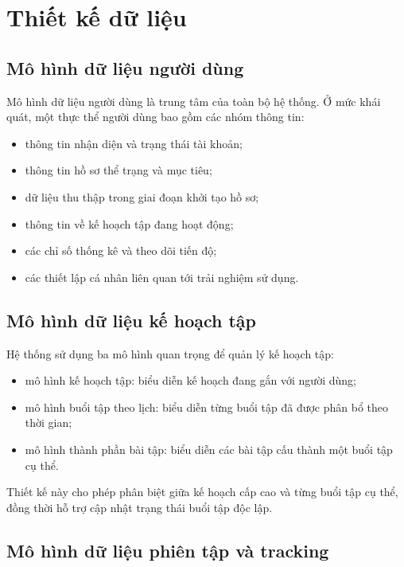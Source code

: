\section{Thiết kế dữ liệu}

\subsection{Mô hình dữ liệu người dùng}

Mô hình dữ liệu người dùng là trung tâm của toàn bộ hệ thống. Ở mức khái quát, một thực thể người dùng bao gồm các nhóm thông tin:

\begin{itemize}
    \item thông tin nhận diện và trạng thái tài khoản;
    \item thông tin hồ sơ thể trạng và mục tiêu;
    \item dữ liệu thu thập trong giai đoạn khởi tạo hồ sơ;
    \item thông tin về kế hoạch tập đang hoạt động;
    \item các chỉ số thống kê và theo dõi tiến độ;
    \item các thiết lập cá nhân liên quan tới trải nghiệm sử dụng.
\end{itemize}

\subsection{Mô hình dữ liệu kế hoạch tập}

Hệ thống sử dụng ba mô hình quan trọng để quản lý kế hoạch tập:

\begin{itemize}
    \item mô hình kế hoạch tập: biểu diễn kế hoạch đang gắn với người dùng;
    \item mô hình buổi tập theo lịch: biểu diễn từng buổi tập đã được phân bổ theo thời gian;
    \item mô hình thành phần bài tập: biểu diễn các bài tập cấu thành một buổi tập cụ thể.
\end{itemize}

Thiết kế này cho phép phân biệt giữa kế hoạch cấp cao và từng buổi tập cụ thể, đồng thời hỗ trợ cập nhật trạng thái buổi tập độc lập.

\subsection{Mô hình dữ liệu phiên tập và tracking}

